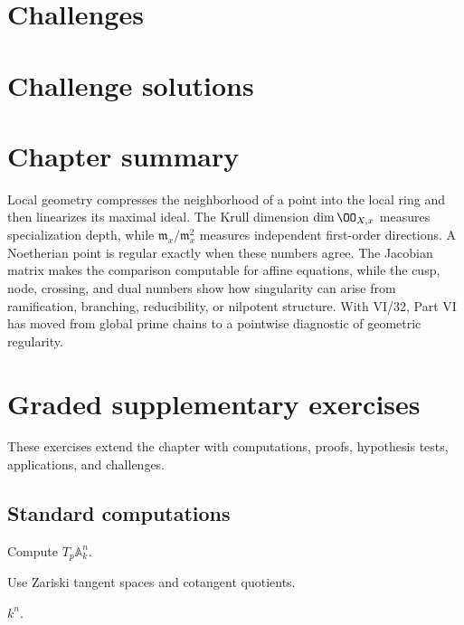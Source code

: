 \section{Challenges}






\ifdefined\IncludeChallengeSolutions
\section{Challenge solutions}

\fi

\section{Chapter summary}\label{sec:vi32-synthesis}
Local geometry compresses the neighborhood of a point into the local ring and then linearizes its maximal ideal.  The
Krull dimension $\dim\OO_{X,x}$ measures specialization depth, while $\mathfrak m_x/\mathfrak m_x^2$ measures independent
first-order directions.  A Noetherian point is regular exactly when these numbers agree.  The Jacobian matrix makes the
comparison computable for affine equations, while the cusp, node, crossing, and dual numbers show how singularity can
arise from ramification, branching, reducibility, or nilpotent structure.  With VI/32, Part VI has moved from global
prime chains to a pointwise diagnostic of geometric regularity.

\section{Graded supplementary exercises}
These exercises extend the chapter with computations, proofs, hypothesis tests, applications, and challenges.

\subsection*{Standard computations}

\begin{exercise}\label{exr:vi32-expand-01}
Compute $T_p\mathbb A^n_k$.
\end{exercise}
\begin{hint}
Use Zariski tangent spaces and cotangent quotients.
\end{hint}
\begin{solution}
$k^n$.
\end{solution}

